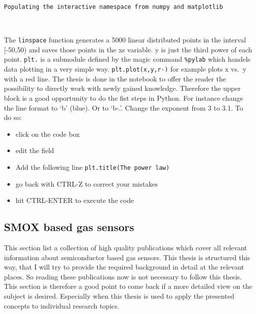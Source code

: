 \documentclass[11pt]{article}
\providecommand{\tightlist}{%
      \setlength{\itemsep}{0pt}\setlength{\parskip}{0pt}}
\begin{document}
    \begin{Verbatim}[commandchars=\\\{\}]
Populating the interactive namespace from numpy and matplotlib
    \end{Verbatim}

    \begin{center}
    \end{center}
    { \hspace*{\fill} \\}
    
    The \texttt{linspace} function generates a 5000 linear distributed
points in the interval {[}-50,50) and saves those points in the xs
variable. y is just the third power of each point. \texttt{plt.} is a
submodule defined by the magic command \texttt{\%pylab} which handels
data plotting in a very simple way.
\texttt{plt.plot(x,y,\textquotesingle{}r-\textquotesingle{})} for
example plots x vs.~y with a red line. The thesis is done in the
notebook to offer the reader the possibility to directly work with newly
gained knowledge. Therefore the upper block is a good opportunity to do
the fist steps in Python. For instance change the line format to `b'
(blue). Or to `b-.'. Change the exponent from 3 to 3.1. To do so:

\begin{itemize}
\tightlist
\item
  click on the code box
\item
  edit the field
\item
  Add the following line
  \texttt{plt.title(\textquotesingle{}The\ power\ law\textquotesingle{})}
\item
  go back with CTRL-Z to correct your mistakes
\item
  hit CTRL-ENTER to execute the code
\end{itemize}

    \hypertarget{smox-based-gas-sensors}{%
\subsection{SMOX based gas sensors}\label{smox-based-gas-sensors}}

This section list a collection of high quality publications which cover
all relevant information about semiconductor based gas sensors. This
thesis is structured this way, that I will try to provide the required
background in detail at the relevant places. So reading these
publications now is not necessary to follow this thesis. This section is
therefore a good point to come back if a more detailed view on the
subject is desired. Especially when this thesis is used to apply the
presented concepts to individual research topics.
\end{document}
